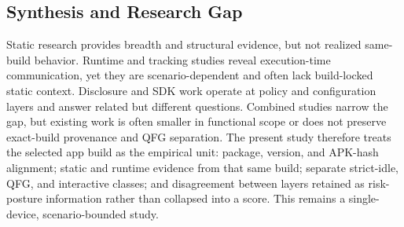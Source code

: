

\subsection{Synthesis and Research Gap}
Static research provides breadth and structural evidence, but not realized same-build behavior. Runtime and tracking studies reveal execution-time communication, yet they are scenario-dependent and often lack build-locked static context. Disclosure and SDK work operate at policy and configuration layers and answer related but different questions. Combined studies narrow the gap, but existing work is often smaller in functional scope or does not preserve exact-build provenance and QFG separation. The present study therefore treats the selected app build as the empirical unit: package, version, and APK-hash alignment; static and runtime evidence from that same build; separate strict-idle, QFG, and interactive classes; and disagreement between layers retained as risk-posture information rather than collapsed into a score. This remains a single-device, scenario-bounded study.
